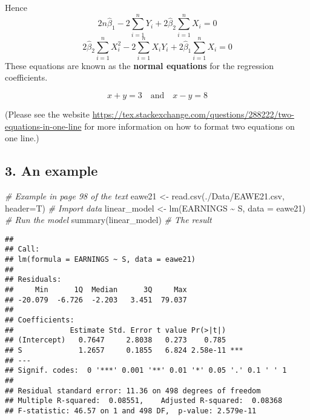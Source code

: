 \documentclass[
]{article}
\newenvironment{Shaded}{\begin{snugshade}}{\end{snugshade}}
\newcommand{\AttributeTok}[1]{\textcolor[rgb]{0.77,0.63,0.00}{#1}}
\newcommand{\CommentTok}[1]{\textcolor[rgb]{0.56,0.35,0.01}{\textit{#1}}}
\newcommand{\FunctionTok}[1]{\textcolor[rgb]{0.00,0.00,0.00}{#1}}
\newcommand{\NormalTok}[1]{#1}
\newcommand{\OtherTok}[1]{\textcolor[rgb]{0.56,0.35,0.01}{#1}}
\newcommand{\SpecialCharTok}[1]{\textcolor[rgb]{0.00,0.00,0.00}{#1}}
\newcommand{\StringTok}[1]{\textcolor[rgb]{0.31,0.60,0.02}{#1}}
\begin{document}
Hence
\[2n\hat{\beta}_{1}-2\sum_{i=1}^{n}Y_i+2\hat{\beta}_{2}\sum_{i=1}^{n}X_i=0\]
\[2\hat{\beta}_{2}\sum_{i=1}^{n}X_i^2-2\sum_{i=1}^{n}X_iY_i+2\hat{\beta}_{1}\sum_{i=1}^{n}X_i=0\]
These equations are known as the \textbf{normal equations} for the
regression coefficients.

\begin{equation}
x+y=3
\quad\mathrm{and}\quad
x-y=8
\end{equation}

(Please see the website
\url{https://tex.stackexchange.com/questions/288222/two-equations-in-one-line}
for more information on how to format two equations on one line.)

\hypertarget{an-example}{%
\subsection{3. An example}\label{an-example}}

\begin{Shaded}
\begin{Highlighting}[]
\CommentTok{\# Example in page 98 of the text}
\NormalTok{eawe21 }\OtherTok{\textless{}{-}} \FunctionTok{read.csv}\NormalTok{(}\StringTok{\textquotesingle{}./Data/EAWE21.csv\textquotesingle{}}\NormalTok{, }\AttributeTok{header=}\NormalTok{T)   }\CommentTok{\# Import data}
\NormalTok{linear\_model }\OtherTok{\textless{}{-}} \FunctionTok{lm}\NormalTok{(EARNINGS }\SpecialCharTok{\textasciitilde{}}\NormalTok{ S, }\AttributeTok{data =}\NormalTok{ eawe21)     }\CommentTok{\# Run the model}
\FunctionTok{summary}\NormalTok{(linear\_model)                               }\CommentTok{\# The result}
\end{Highlighting}
\end{Shaded}

\begin{verbatim}
## 
## Call:
## lm(formula = EARNINGS ~ S, data = eawe21)
## 
## Residuals:
##     Min      1Q  Median      3Q     Max 
## -20.079  -6.726  -2.203   3.451  79.037 
## 
## Coefficients:
##             Estimate Std. Error t value Pr(>|t|)    
## (Intercept)   0.7647     2.8038   0.273    0.785    
## S             1.2657     0.1855   6.824 2.58e-11 ***
## ---
## Signif. codes:  0 '***' 0.001 '**' 0.01 '*' 0.05 '.' 0.1 ' ' 1
## 
## Residual standard error: 11.36 on 498 degrees of freedom
## Multiple R-squared:  0.08551,    Adjusted R-squared:  0.08368 
## F-statistic: 46.57 on 1 and 498 DF,  p-value: 2.579e-11
\end{verbatim}
\end{document}
